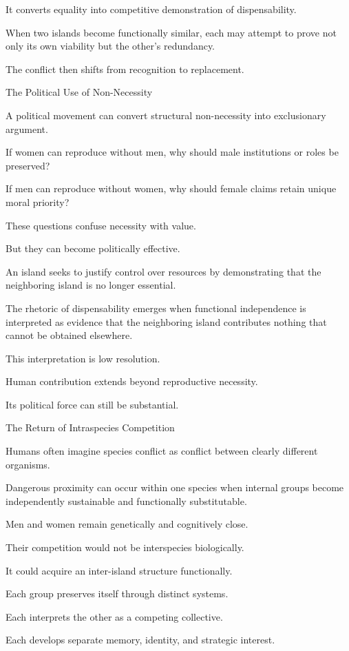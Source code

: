 It converts equality into competitive demonstration of dispensability.

When two islands become functionally similar, each may attempt to prove not only its own viability but the other’s redundancy.

The conflict then shifts from recognition to replacement.

The Political Use of Non-Necessity

A political movement can convert structural non-necessity into exclusionary argument.

If women can reproduce without men, why should male institutions or roles be preserved?

If men can reproduce without women, why should female claims retain unique moral priority?

These questions confuse necessity with value.

But they can become politically effective.

An island seeks to justify control over resources by demonstrating that the neighboring island is no longer essential.

The rhetoric of dispensability emerges when functional independence is interpreted as evidence that the neighboring island contributes nothing that cannot be obtained elsewhere.

This interpretation is low resolution.

Human contribution extends beyond reproductive necessity.

Its political force can still be substantial.

The Return of Intraspecies Competition

Humans often imagine species conflict as conflict between clearly different organisms.

Dangerous proximity can occur within one species when internal groups become independently sustainable and functionally substitutable.

Men and women remain genetically and cognitively close.

Their competition would not be interspecies biologically.

It could acquire an inter-island structure functionally.

Each group preserves itself through distinct systems.

Each interprets the other as a competing collective.

Each develops separate memory, identity, and strategic interest.

